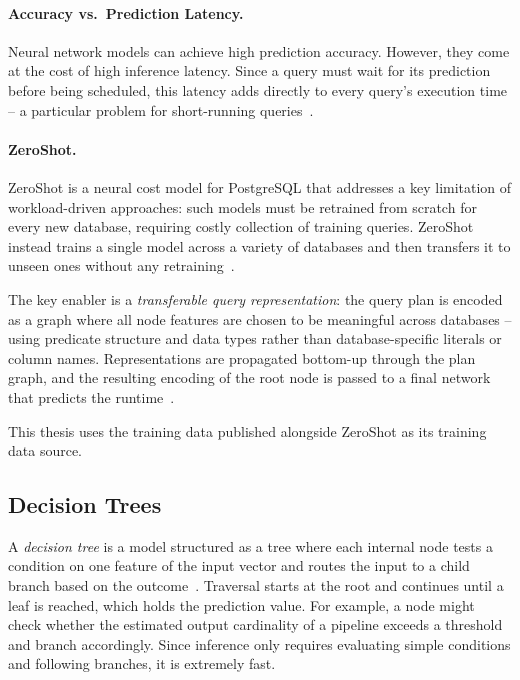 \paragraph{Accuracy vs.\ Prediction Latency.}
Neural network models can achieve high prediction accuracy.
However, they come at the cost of high inference latency.
Since a query must wait for its prediction before being scheduled, this latency adds directly to every query's execution time -- a particular problem for short-running queries~\parencite{t3}.

\paragraph{ZeroShot.}
ZeroShot is a neural cost model for PostgreSQL that addresses a key limitation of workload-driven approaches: such models must be retrained from scratch for every new database, requiring costly collection of training queries.
ZeroShot instead trains a single model across a variety of databases and then transfers it to unseen ones without any retraining~\parencite{zeroshot}.

The key enabler is a \emph{transferable query representation}: the query plan is encoded as a graph where all node features are chosen to be meaningful across databases -- using predicate structure and data types rather than database-specific literals or column names.
Representations are propagated bottom-up through the plan graph, and the resulting encoding of the root node is passed to a final network that predicts the runtime~\parencite{zeroshot}.

This thesis uses the training data published alongside ZeroShot as its training data source.

\subsection{Decision Trees}

A \emph{decision tree} is a model structured as a tree where each internal node tests a condition on one feature of the input vector and routes the input to a child branch based on the outcome~\parencite{cart}.
Traversal starts at the root and continues until a leaf is reached, which holds the prediction value.
For example, a node might check whether the estimated output cardinality of a pipeline exceeds a threshold and branch accordingly.
Since inference only requires evaluating simple conditions and following branches, it is extremely fast.


